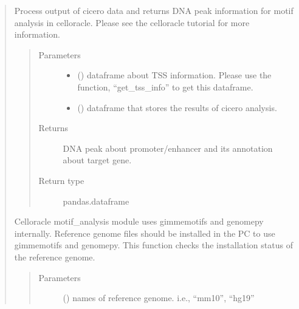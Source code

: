 \documentclass[letterpaper,10pt,english]{sphinxmanual}
\begin{document}
\begin{quote}
\begin{fulllineitems}
\label{\detokenize{modules/celloracle.motif_analysis:celloracle.motif_analysis.integrate_tss_peak_with_cicero}}
Process output of cicero data and returns DNA peak information for motif analysis in celloracle.
Please see the celloracle tutorial for more information.
\begin{quote}\begin{description}
\item[{Parameters}] \leavevmode\begin{itemize}
\item {} 
 () \textendash{} dataframe about TSS information. Please use the function, “get\_tss\_info” to get this dataframe.

\item {} 
 () \textendash{} dataframe that stores the results of cicero analysis.

\end{itemize}

\item[{Returns}] \leavevmode
DNA peak about promoter/enhancer and its annotation about target gene.

\item[{Return type}] \leavevmode
pandas.dataframe

\end{description}\end{quote}

\end{fulllineitems}


\begin{fulllineitems}
\label{\detokenize{modules/celloracle.motif_analysis:celloracle.motif_analysis.is_genome_installed}}
Celloracle motif\_analysis module uses gimmemotifs and genomepy internally.
Reference genome files should be installed in the PC to use gimmemotifs and genomepy.
This function checks the installation status of the reference genome.
\begin{quote}\begin{description}
\item[{Parameters}] \leavevmode
{} () \textendash{} names of reference genome. i.e., “mm10”, “hg19”


\end{description}
\end{quote}
\end{fulllineitems}
\end{quote}
\end{document}
